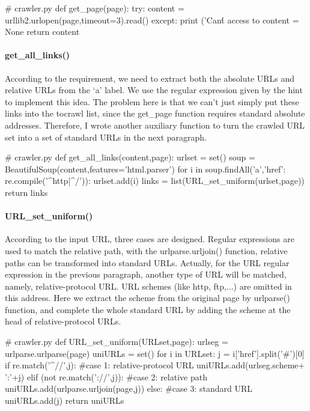 \documentclass{article}
\begin{document}
\begin{python}
# crawler.py
def get_page(page):
    try:
        content = urllib2.urlopen(page,timeout=3).read()
    except:
        print ('Can\'t access to %
        content = None
    return content
\end{python}

\paragraph{get\_all\_links()} According to the requirement, we need to extract both the absolute URLs and relative URLs from the `a' label. We use the regular expression given by the hint to implement this idea. The problem here is that we can't just simply put these links into the tocrawl list, since the get\_page function requires standard absolute addresses. Therefore, I wrote another auxiliary function to turn the crawled URL set into a set of standard URLs in the next paragraph.

\begin{python}
# crawler.py
def get_all_links(content,page):
    urlset = set()
    soup = BeautifulSoup(content,features='html.parser')
    for i in soup.findAll('a',{'href': re.compile('^http|^/')}):
        urlset.add(i)
    links = list(URL_set_uniform(urlset,page))
    return links
\end{python}

\paragraph{URL\_set\_uniform()} According to the input URL, three cases are designed. Regular expressions are used to match the relative path, with the urlparse.urljoin() function, relative paths can be transformed into standard URLs. Actually, for the URL regular expression in the previous paragraph, another type of URL will be matched, namely, relative-protocol URL. URL schemes (like http, ftp,...) are omitted in this address. Here we extract the scheme from the original page by urlparse() function, and complete the whole standard URL by adding the scheme at the head of relative-protocol URLs.  

\begin{python}
# crawler.py
def URL_set_uniform(URLset,page):
    urlseg = urlparse.urlparse(page)
    uniURLs = set()
    for i in URLset:
        j = i['href'].split('#')[0]
        if re.match('^//',j):         #case 1: relative-protocol URL
            uniURLs.add(urlseg.scheme+ ':'+j)
        elif (not re.match('://',j)): #case 2: relative path
            uniURLs.add(urlparse.urljoin(page,j))
        else:                         #case 3: standard URL
            uniURLs.add(j)
    return uniURLs
\end{python}
\end{document}
